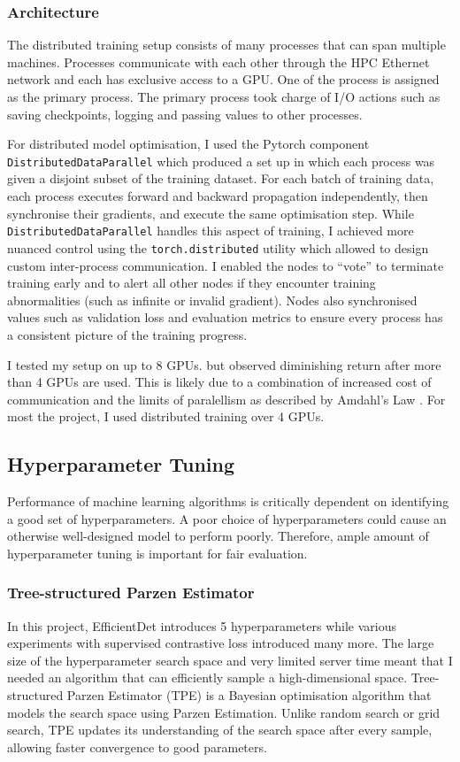 \documentclass[12pt,a4paper,twoside,openany]{report}
\begin{document}
\subsubsection{Architecture}
The distributed training setup consists of many processes that can span multiple machines. Processes communicate with each other through the HPC Ethernet network and each has exclusive access to a GPU. One of the process is assigned as the primary process. The primary process took charge of I/O actions such as saving checkpoints, logging and passing values to other processes. 

For distributed model optimisation, I used the Pytorch component \verb|DistributedDataParallel| which produced a set up in which each process was given a disjoint subset of the training dataset. For each batch of training data, each process executes forward and backward propagation independently, then synchronise their gradients, and execute the same optimisation step. While \verb|DistributedDataParallel| handles this aspect of training, I achieved more nuanced control using the \verb|torch.distributed| utility which allowed to design custom inter-process communication. I enabled the nodes to ``vote'' to terminate training early and to alert all other nodes if they encounter training abnormalities (such as infinite or invalid gradient). Nodes also synchronised values such as validation loss and evaluation metrics to ensure every process has a consistent picture of the training progress. 

 I tested my setup on up to 8 GPUs. but observed diminishing return after more than 4 GPUs are used. This is likely due to a combination of increased cost of communication and the limits of paralellism as described by Amdahl's Law \cite{amdahl_validity_1967}. For most the project, I used distributed training over 4 GPUs. 

\subsection{Hyperparameter Tuning}
Performance of machine learning algorithms is critically dependent on identifying a good set of hyperparameters. A poor choice of hyperparameters could cause an otherwise well-designed model to perform poorly. Therefore, ample amount of hyperparameter tuning is important for fair evaluation.

\subsubsection{Tree-structured Parzen Estimator}
In this project, EfficientDet introduces 5 hyperparameters while various experiments with supervised contrastive loss introduced many more. The large size of the hyperparameter search space and very limited server time meant that I needed an algorithm that can efficiently sample a high-dimensional space.
Tree-structured Parzen Estimator (TPE) \cite{bergstra_algorithms_2011} is a Bayesian optimisation algorithm that models the search space using Parzen Estimation. Unlike random search or grid search, TPE updates its understanding of the search space after every sample, allowing faster convergence to good parameters.
\end{document}
